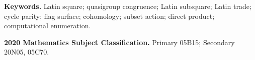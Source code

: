 \documentclass[11pt]{article}
\theoremstyle{definition}
\theoremstyle{remark}
\begin{document}
\noindent\textbf{Keywords.}
Latin square; quasigroup congruence; Latin subsquare; Latin trade; cycle
parity; flag surface; cohomology; subset action; direct product;
computational enumeration.

\medskip
\noindent\textbf{2020 Mathematics Subject Classification.}
Primary 05B15; Secondary 20N05, 05C70.















\footnotesize


\end{document}
